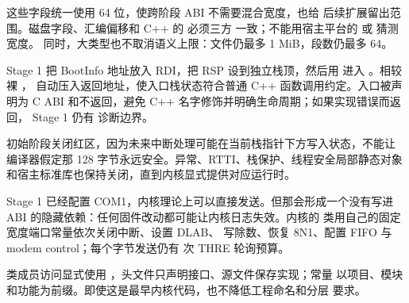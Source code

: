 这些字段统一使用 64 位，使跨阶段 ABI 不需要混合宽度，也给
后续扩展留出范围。磁盘字段、汇编偏移和 C++ 的  必须三方
一致；不能用宿主平台的  或  猜测宽度。
同时，大类型也不取消语义上限：文件仍最多 1 MiB，段数仍最多 64。

Stage 1 把 BootInfo 地址放入 RDI，把 RSP 设到独立栈顶，然后用
 进入 。相较裸 ，
自动压入返回地址，使入口栈状态符合普通 C++ 函数调用约定。入口被声明为
C ABI 和不返回，避免 C++ 名字修饰并明确生命周期；如果实现错误而返回，
Stage 1 仍有  诊断边界。

初始阶段关闭红区，因为未来中断处理可能在当前栈指针下方写入状态，不能让
编译器假定那 128 字节永远安全。异常、RTTI、栈保护、线程安全局部静态对象
和宿主标准库也保持关闭，直到内核显式提供对应运行时。

Stage 1 已经配置 COM1，内核理论上可以直接发送。但那会形成一个没有写进 ABI
的隐藏依赖：任何固件改动都可能让内核日志失效。内核的
 类用自己的固定宽度端口常量依次关闭中断、设置 DLAB、
写除数、恢复 8N1、配置 FIFO 与 modem control；每个字节发送仍有
 次 THRE 轮询预算。

类成员访问显式使用 ，头文件只声明接口、源文件保存实现；常量
以项目、模块和功能为前缀。即使这是最早内核代码，也不降低工程命名和分层
要求。

